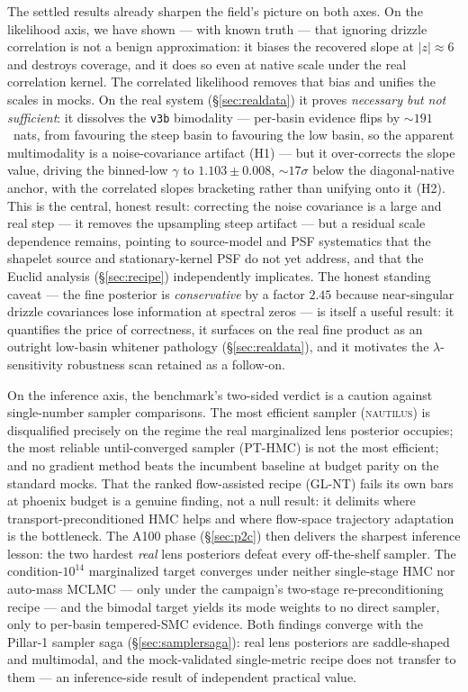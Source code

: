 \documentclass[11pt,letterpaper]{article}
\newcommand{\gammaEPL}{\ensuremath{\gamma}}
\newcommand{\nautilus}{\textsc{nautilus}}
\newcommand{\dfile}[1]{\texttt{#1}}
\begin{document}
The settled results already sharpen the field's picture on both axes. On the
likelihood axis, we have shown --- with known truth --- that ignoring drizzle
correlation is not a benign approximation: it biases the recovered slope at
$|z|\approx6$ and destroys coverage, and it does so even at native scale under
the real correlation kernel. The correlated likelihood removes that bias and
unifies the scales in mocks. On the real system (\S\ref{sec:realdata}) it proves
{\it necessary but not sufficient}: it dissolves the \dfile{v3b} bimodality ---
per-basin evidence flips by $\sim$$191$~nats, from favouring the steep basin to
favouring the low basin, so the apparent multimodality is a noise-covariance
artifact (H1) --- but it over-corrects the slope value, driving the binned-low
$\gammaEPL$ to $1.103\pm0.008$, $\sim$$17\sigma$ below the diagonal-native
anchor, with the correlated slopes bracketing rather than unifying onto it (H2).
This is the central, honest result: correcting the noise covariance is a large
and real step --- it removes the upsampling steep artifact --- but a residual
scale dependence remains, pointing to source-model and PSF systematics that the
shapelet source and stationary-kernel PSF do not yet address, and that the Euclid
analysis (\S\ref{sec:recipe}) independently implicates. The honest standing
caveat --- the fine posterior is {\it conservative} by a factor $2.45$ because
near-singular drizzle covariances lose information at spectral zeros --- is
itself a useful result: it quantifies the price of correctness, it surfaces on
the real fine product as an outright low-basin whitener pathology
(\S\ref{sec:realdata}), and it motivates the $\lambda$-sensitivity robustness
scan retained as a follow-on.

On the inference axis, the benchmark's two-sided verdict is a caution against
single-number sampler comparisons. The most efficient sampler (\nautilus) is
disqualified precisely on the regime the real marginalized lens posterior
occupies; the most reliable until-converged sampler (PT-HMC) is not the most
efficient; and no gradient method beats the incumbent baseline at budget parity
on the standard mocks. That the ranked flow-assisted recipe (GL-NT) fails its
own bars at phoenix budget is a genuine finding, not a null result: it delimits
where transport-preconditioned HMC helps and where flow-space trajectory
adaptation is the bottleneck. The A100 phase (\S\ref{sec:p2c}) then delivers the
sharpest inference lesson: the two hardest {\it real} lens posteriors defeat
every off-the-shelf sampler. The condition-$10^{14}$ marginalized target
converges under neither single-stage HMC nor auto-mass MCLMC --- only under the
campaign's two-stage re-preconditioning recipe --- and the bimodal target
yields its mode weights to no direct sampler, only to per-basin tempered-SMC
evidence. Both findings converge with the Pillar-1 sampler saga
(\S\ref{sec:samplersaga}): real lens posteriors are saddle-shaped and
multimodal, and the mock-validated single-metric recipe does not transfer to
them --- an inference-side result of independent practical value.
\end{document}
